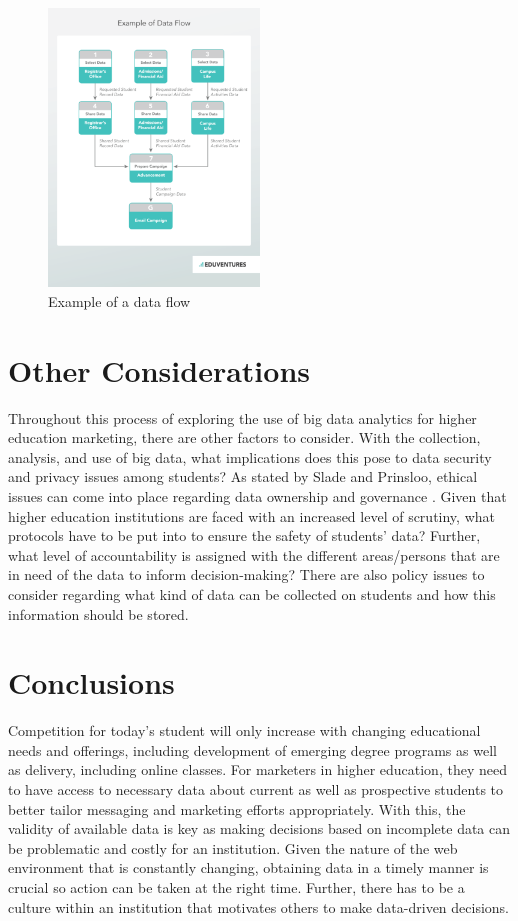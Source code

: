 \documentclass[sigconf]{acmart}
\begin{document}
\begin{figure}[p!]
    \includegraphics[width=0.5\textwidth]{dataflow2}
    \caption{Example of a data flow \cite{Wiley2016}}
    \label{fig:figure1}
\end{figure}

\section{Other Considerations}
Throughout this process of exploring the use of big data analytics for higher education marketing, there are other factors to consider. With the collection, analysis, and use of big data, what implications does this pose to data security and privacy issues among students? As stated by Slade and Prinsloo, ethical issues can come into place regarding data ownership and governance \cite{Slade2013}. Given that higher education institutions are faced with an increased level of scrutiny, what protocols have to be put into to ensure the safety of students' data? Further, what level of accountability is assigned with the different areas/persons that are in need of the data to inform decision-making? There are also policy issues to consider regarding what kind of data can be collected on students and how this information should be stored. 

\section{Conclusions}

Competition for today's student will only increase with changing educational needs and offerings, including development of emerging degree programs as well as delivery, including online classes. For marketers in higher education, they need to have access to necessary data about current as well as prospective students to better tailor messaging and marketing efforts appropriately. With this, the validity of available data is key as making decisions based on incomplete data can be problematic and costly for an institution. Given the nature of the web environment that is constantly changing, obtaining data in a timely manner is crucial so action can be taken at the right time. Further, there has to be a culture within an institution that motivates others to make data-driven decisions.   






 
\end{document}

